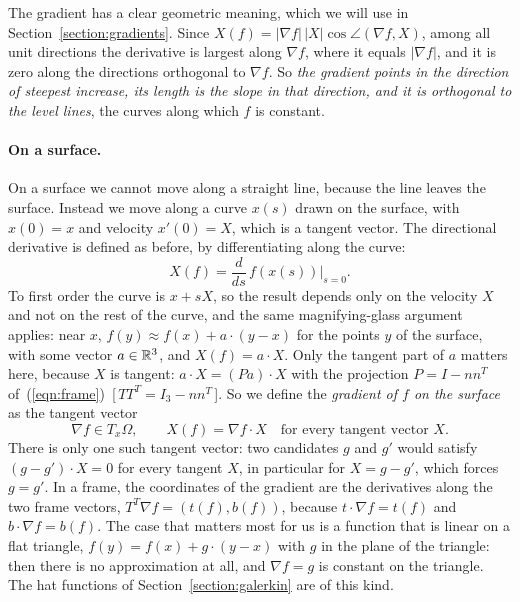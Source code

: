 The gradient has a clear geometric meaning, which we will use in Section~\ref{section:gradients}. Since $X(f) = |\nabla f|\,|X| \cos\angle(\nabla f, X)$, among all unit directions the derivative is largest along $\nabla f$, where it equals $|\nabla f|$, and it is zero along the directions orthogonal to $\nabla f$. So \emph{the gradient points in the direction of steepest increase, its length is the slope in that direction, and it is orthogonal to the level lines}, the curves along which $f$ is constant.

\paragraph{On a surface.} On a surface we cannot move along a straight line, because the line leaves the surface. Instead we move along a curve $x(s)$ drawn on the surface, with $x(0) = x$ and velocity $x'(0) = X$, which is a tangent vector. The directional derivative is defined as before, by differentiating along the curve:
\begin{equation*}
X(f) = \frac{d}{ds}\, f(x(s)) \Big|_{s = 0} .
\end{equation*}
To first order the curve is $x + sX$, so the result depends only on the velocity $X$ and not on the rest of the curve, and the same magnifying-glass argument applies: near $x$, $f(y) \approx f(x) + a\cdot (y - x)$ for the points $y$ of the surface, with some vector $a \in \mathbb{R}^3$, and $X(f) = a\cdot X$. Only the tangent part of $a$ matters here, because $X$ is tangent: $a\cdot X = (Pa)\cdot X$ with the projection $P = I - nn^T$ of~(\ref{eqn:frame})~[\,$TT^T = I_3 - nn^T$\,]. So we define the \emph{gradient of $f$ on the surface} as the tangent vector
\begin{equation*}
\nabla f \in T_x\Omega, \qquad X(f) = \nabla f\cdot X \quad \text{for every tangent vector } X .
\end{equation*}
There is only one such tangent vector: two candidates $g$ and $g'$ would satisfy $(g - g')\cdot X = 0$ for every tangent $X$, in particular for $X = g - g'$, which forces $g = g'$. In a frame, the coordinates of the gradient are the derivatives along the two frame vectors, $T^T \nabla f = (t(f), b(f))$, because $t\cdot\nabla f = t(f)$ and $b\cdot \nabla f = b(f)$. The case that matters most for us is a function that is linear on a flat triangle, $f(y) = f(x) + g \cdot (y - x)$ with $g$ in the plane of the triangle: then there is no approximation at all, and $\nabla f = g$ is constant on the triangle. The hat functions of Section~\ref{section:galerkin} are of this kind.

